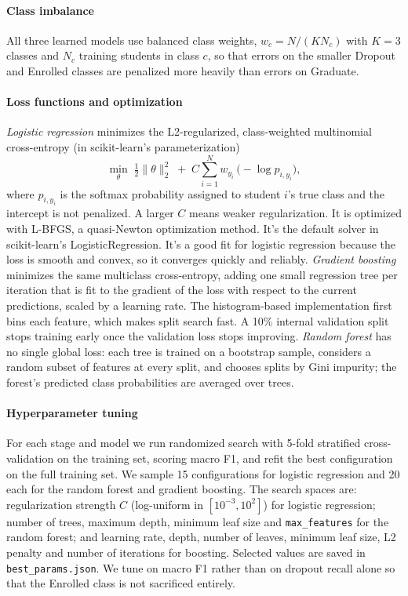 \documentclass[11pt]{article}
\begin{document}
\paragraph{Class imbalance} All three learned models use balanced class weights, $w_c = N/(K N_c)$ with $K=3$ classes and $N_c$ training students in class $c$, so that errors on the smaller Dropout and Enrolled classes are penalized more heavily than errors on Graduate.
 
\paragraph{Loss functions and optimization}
\emph{Logistic regression} minimizes the L2-regularized, class-weighted multinomial cross-entropy (in scikit-learn's parameterization)
\begin{equation*}
\min_{\theta}\; \tfrac{1}{2}\lVert\theta\rVert_2^2 \;+\; C\sum_{i=1}^{N} w_{y_i}\,\bigl(-\log p_{i,y_i}\bigr),
\end{equation*}
where $p_{i,y_i}$ is the softmax probability assigned to student $i$'s true class and the intercept is not penalized. A larger $C$ means weaker regularization. It is optimized with L-BFGS, a quasi-Newton optimization method. It’s the default solver in scikit-learn’s LogisticRegression. It’s a good fit for logistic regression because the loss is smooth and convex, so it converges quickly and reliably.
\emph{Gradient boosting} minimizes the same multiclass cross-entropy, adding one small regression tree per iteration that is fit to the gradient of the loss with respect to the current predictions, scaled by a learning rate. The histogram-based implementation first bins each feature, which makes split search fast. A 10\% internal validation split stops training early once the validation loss stops improving.
\emph{Random forest} has no single global loss: each tree is trained on a bootstrap sample, considers a random subset of features at every split, and chooses splits by Gini impurity; the forest's predicted class probabilities are averaged over trees.
 
\paragraph{Hyperparameter tuning} For each stage and model we run randomized search with 5-fold stratified cross-validation on the training set, scoring macro F1, and refit the best configuration on the full training set. We sample 15 configurations for logistic regression and 20 each for the random forest and gradient boosting. The search spaces are: regularization strength $C$ (log-uniform in $[10^{-3},10^{2}]$) for logistic regression; number of trees, maximum depth, minimum leaf size and \texttt{max\_features} for the random forest; and learning rate, depth, number of leaves, minimum leaf size, L2 penalty and number of iterations for boosting. Selected values are saved in \texttt{best\_params.json}. We tune on macro F1 rather than on dropout recall alone so that the Enrolled class is not sacrificed entirely.
 
\end{document}
